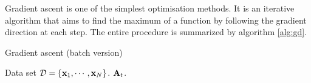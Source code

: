 	Gradient ascent is one of the simplest optimisation methods. It is an iterative algorithm that aims to find the maximum of a function by following the gradient direction at each step. The entire procedure is summarized by algorithm \ref{alg:gd}.
      
	\begin{algorithm} 
		\caption{Gradient ascent (batch version)} 
		\label{alg:gd}  
		\begin{algorithmic}[1]                    %
			\REQUIRE Data set $\mathcal{D}=\{\mathbf{x}_1,\cdots,\mathbf{x}_N\}$.
			 \label{alg:gd-init}
			\REPEAT
			\RETURN $\mathbf{A}_{t}$.
		\end{algorithmic}
	\end{algorithm}

